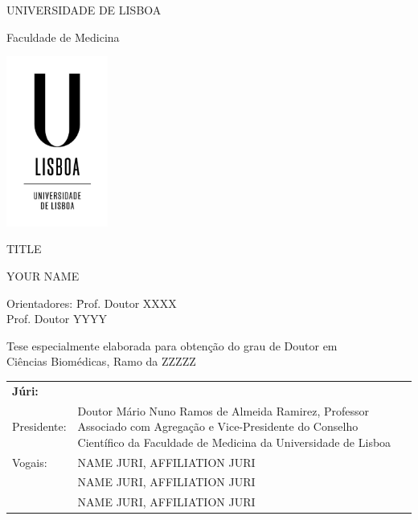 \documentclass[12pt, twoside]{report}
\begin{document}
\begin{titlepage}
    \begin{center}
        \vspace*{-.2cm}
        UNIVERSIDADE DE LISBOA
        
        Faculdade de Medicina
        
        \includegraphics[width=0.25\textwidth]{images/logo/ulisboa-only}

        TITLE
            
        YOUR NAME
        
    \end{center}

    \begin{tabbing}
        Orientadores: \= Prof. Doutor XXXX \\
                      \> Prof. Doutor YYYY
    \end{tabbing}
    
    \begin{center}
        Tese especialmente elaborada para obtenção do grau de Doutor em\\
        Ciências Biomédicas, Ramo da ZZZZZ
    \end{center}

    \noindent\begin{tabular}{@{} l p{13.1cm} }
        \textbf{Júri:} \\
        
        Presidente: & Doutor Mário Nuno Ramos de Almeida Ramirez, Professor Associado com Agregação e Vice-Presidente do Conselho Científico da Faculdade de Medicina da Universidade de Lisboa \\
        
        Vogais: & NAME JURI, AFFILIATION JURI \\

        & NAME JURI, AFFILIATION JURI \\

        & NAME JURI, AFFILIATION JURI \\


\end{tabular}
\end{titlepage}
\end{document}
